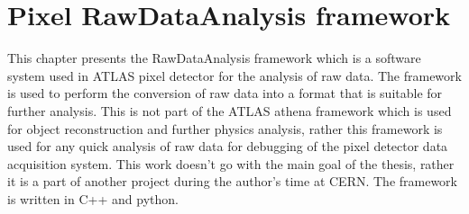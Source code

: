 \chapter{Pixel RawDataAnalysis framework}
This chapter presents the RawDataAnalysis framework which is a software system used in ATLAS pixel detector for the analysis of raw data. The framework is used to perform the conversion of raw data into a format that is suitable for further analysis. This is not part of the ATLAS athena framework which is used for object reconstruction and further physics analysis, rather this framework is used for any quick analysis of raw data for debugging of the pixel detector data acquisition system. This work doesn't go with the main goal of the thesis, rather it is a part of another project during the author's time at CERN. The framework is written in C++ and python.